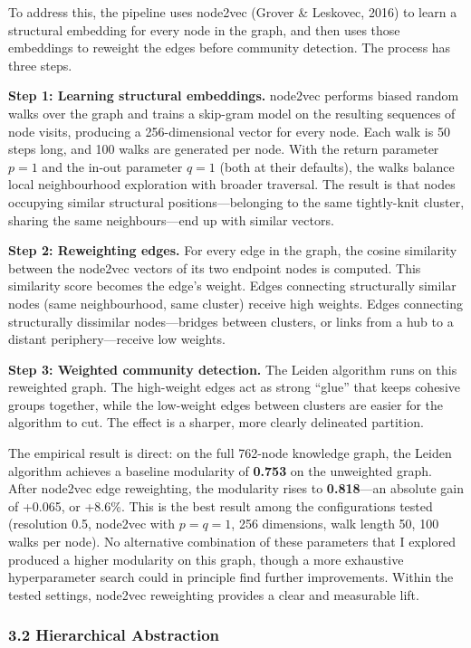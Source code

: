 \documentclass[11pt]{article}
\begin{document}
To address this, the pipeline uses node2vec (Grover \& Leskovec, 2016) to learn a structural embedding for every node in the graph, and then uses those embeddings to reweight the edges before community detection. The process has three steps.

\textbf{Step 1: Learning structural embeddings.} node2vec performs biased random walks over the graph and trains a skip-gram model on the resulting sequences of node visits, producing a 256-dimensional vector for every node. Each walk is 50 steps long, and 100 walks are generated per node. With the return parameter $p = 1$ and the in-out parameter $q = 1$ (both at their defaults), the walks balance local neighbourhood exploration with broader traversal. The result is that nodes occupying similar structural positions---belonging to the same tightly-knit cluster, sharing the same neighbours---end up with similar vectors.

\textbf{Step 2: Reweighting edges.} For every edge in the graph, the cosine similarity between the node2vec vectors of its two endpoint nodes is computed. This similarity score becomes the edge's weight. Edges connecting structurally similar nodes (same neighbourhood, same cluster) receive high weights. Edges connecting structurally dissimilar nodes---bridges between clusters, or links from a hub to a distant periphery---receive low weights.

\textbf{Step 3: Weighted community detection.} The Leiden algorithm runs on this reweighted graph. The high-weight edges act as strong ``glue'' that keeps cohesive groups together, while the low-weight edges between clusters are easier for the algorithm to cut. The effect is a sharper, more clearly delineated partition.

The empirical result is direct: on the full 762-node knowledge graph, the Leiden algorithm achieves a baseline modularity of \textbf{0.753} on the unweighted graph. After node2vec edge reweighting, the modularity rises to \textbf{0.818}---an absolute gain of +0.065, or +8.6\%. This is the best result among the configurations tested (resolution 0.5, node2vec with $p = q = 1$, 256 dimensions, walk length 50, 100 walks per node). No alternative combination of these parameters that I explored produced a higher modularity on this graph, though a more exhaustive hyperparameter search could in principle find further improvements. Within the tested settings, node2vec reweighting provides a clear and measurable lift.


\subsubsection{3.2 Hierarchical Abstraction}
\end{document}
